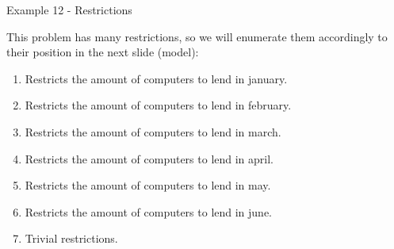 \begin{frame}{Example 12 - Restrictions}

This problem has many restrictions, so we will enumerate them accordingly to
their position in the next slide (model):

\begin{enumerate}
\item Restricts the amount of computers to lend in january.
\item Restricts the amount of computers to lend in february.
\item Restricts the amount of computers to lend in march.
\item Restricts the amount of computers to lend in april.
\item Restricts the amount of computers to lend in may.
\item Restricts the amount of computers to lend in june.
\item Trivial restrictions.
\end{enumerate}

\end{frame}
